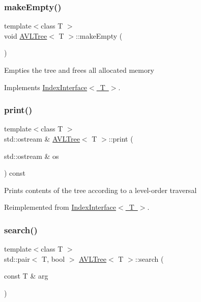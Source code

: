 \subsubsection{\texorpdfstring{make\+Empty()}{makeEmpty()}}
{\footnotesize\ttfamily template$<$class T $>$ \\
void \mbox{\hyperlink{classAVLTree}{A\+V\+L\+Tree}}$<$ T $>$\+::make\+Empty (\begin{DoxyParamCaption}{ }\end{DoxyParamCaption})\hspace{0.3cm}{\ttfamily [virtual]}}

Empties the tree and frees all allocated memory 

Implements \mbox{\hyperlink{classIndexInterface}{Index\+Interface$<$ T $>$}}.

\mbox{\label{classAVLTree_af5299ff77e912f72481679bf9f380810}} 
\subsubsection{\texorpdfstring{print()}{print()}}
{\footnotesize\ttfamily template$<$class T $>$ \\
std\+::ostream \& \mbox{\hyperlink{classAVLTree}{A\+V\+L\+Tree}}$<$ T $>$\+::print (\begin{DoxyParamCaption}\item[{std\+::ostream \&}]{os }\end{DoxyParamCaption}) const\hspace{0.3cm}{\ttfamily [virtual]}}

Prints contents of the tree according to a level-\/order traversal 

Reimplemented from \mbox{\hyperlink{classIndexInterface}{Index\+Interface$<$ T $>$}}.

\mbox{\label{classAVLTree_abc89056d84bd8b7f625f0716788154fb}} 
\subsubsection{\texorpdfstring{search()}{search()}}
{\footnotesize\ttfamily template$<$class T $>$ \\
std\+::pair$<$ T, bool $>$ \mbox{\hyperlink{classAVLTree}{A\+V\+L\+Tree}}$<$ T $>$\+::search (\begin{DoxyParamCaption}\item[{const T \&}]{arg }\end{DoxyParamCaption})\hspace{0.3cm}{\ttfamily [virtual]}}

